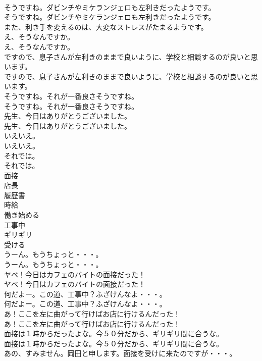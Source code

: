 \documentclass[8pt]{extreport}
\begin{document}
\begin{CJK}{UTF8}{min}
\\	そうですね。ダビンチやミケランジェロも左利きだったようです。	
\\	そうですね。ダビンチやミケランジェロも左利きだったようです。 
\\	また、利き手を変えるのは、大変なストレスがたまるようです。	
\\	え、そうなんですか。	
\\	え、そうなんですか。 
\\	ですので、息子さんが左利きのままで良いように、学校と相談するのが良いと思います。	
\\	ですので、息子さんが左利きのままで良いように、学校と相談するのが良いと思います。 
\\	そうですね。それが一番良さそうですね。	
\\	そうですね。それが一番良さそうですね。 
\\	先生、今日はありがとうございました。	
\\	先生、今日はありがとうございました。 
\\	いえいえ。	
\\	いえいえ。 
\\	それでは。	
\\	それでは。 
\\	面接
\\	店長
\\	履歴書
\\	時給
\\	働き始める
\\	工事中
\\	ギリギリ
\\	受ける
\\	うーん。もうちょっと・・・。	
\\	うーん。もうちょっと・・・。 
\\	ヤベ！今日はカフェのバイトの面接だった！	
\\	ヤベ！今日はカフェのバイトの面接だった！ 
\\	何だよー。この道、工事中？ふざけんなよ・・・。	
\\	何だよー。この道、工事中？ふざけんなよ・・・。 
\\	あ！ここを左に曲がって行けばお店に行けるんだった！	
\\	あ！ここを左に曲がって行けばお店に行けるんだった！ 
\\	面接は１時からだったよな。今５０分だから、ギリギリ間に合うな。	
\\	面接は１時からだったよな。今５０分だから、ギリギリ間に合うな。 
\\	あの、すみません。岡田と申します。面接を受けに来たのですが・・・。	

\end{CJK}
\end{document}
